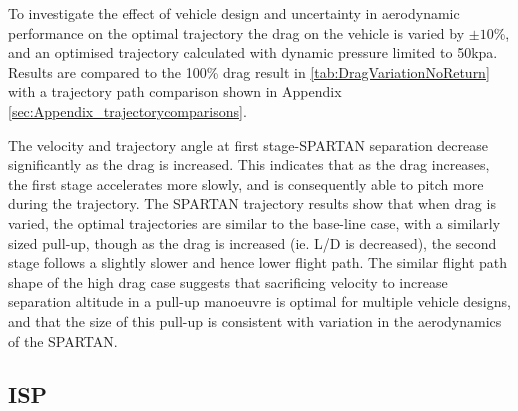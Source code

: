 To investigate the effect of vehicle design and uncertainty in aerodynamic performance on the optimal trajectory the drag on the vehicle is varied by $\pm10$\%, and an optimised trajectory calculated with dynamic pressure limited to 50kpa. Results are compared to the 100\% drag result in \ref{tab:DragVariationNoReturn} with a trajectory path comparison shown in Appendix \ref{sec:Appendix_trajectorycomparisons}. 

The velocity and trajectory angle at first stage-SPARTAN separation decrease significantly as the drag is increased. This indicates that as the drag increases, the first stage accelerates more slowly, and is consequently able to pitch more during the trajectory.
The SPARTAN trajectory results show that when drag is varied, the optimal trajectories are similar to the base-line case, with a similarly sized pull-up, though as the drag is increased (ie. L/D is decreased), the second stage follows a slightly slower and hence lower flight path. The similar flight path shape of the high drag case suggests that sacrificing velocity to increase separation altitude in a pull-up manoeuvre is optimal for multiple vehicle designs, and that the size of this pull-up is consistent with variation in the aerodynamics of the SPARTAN.



\subsection{ISP}


